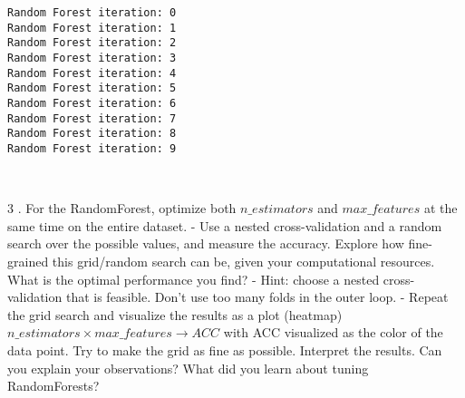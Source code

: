 \documentclass[11pt]{article}
\begin{document}
    \begin{Verbatim}[commandchars=\\\{\}]
Random Forest iteration: 0 
Random Forest iteration: 1 
Random Forest iteration: 2 
Random Forest iteration: 3 
Random Forest iteration: 4 
Random Forest iteration: 5 
Random Forest iteration: 6 
Random Forest iteration: 7 
Random Forest iteration: 8 
Random Forest iteration: 9 

    \end{Verbatim}

    \begin{center}
    \end{center}
    { \hspace*{\fill} \\}
    
    3 . For the RandomForest, optimize both \(n\_estimators\) and
\(max\_features\) at the same time on the entire dataset. - Use a nested
cross-validation and a random search over the possible values, and
measure the accuracy. Explore how fine-grained this grid/random search
can be, given your computational resources. What is the optimal
performance you find? - Hint: choose a nested cross-validation that is
feasible. Don't use too many folds in the outer loop. - Repeat the grid
search and visualize the results as a plot (heatmap)
\(n\_estimators \times max\_features \rightarrow ACC\) with ACC
visualized as the color of the data point. Try to make the grid as fine
as possible. Interpret the results. Can you explain your observations?
What did you learn about tuning RandomForests?
\end{document}
